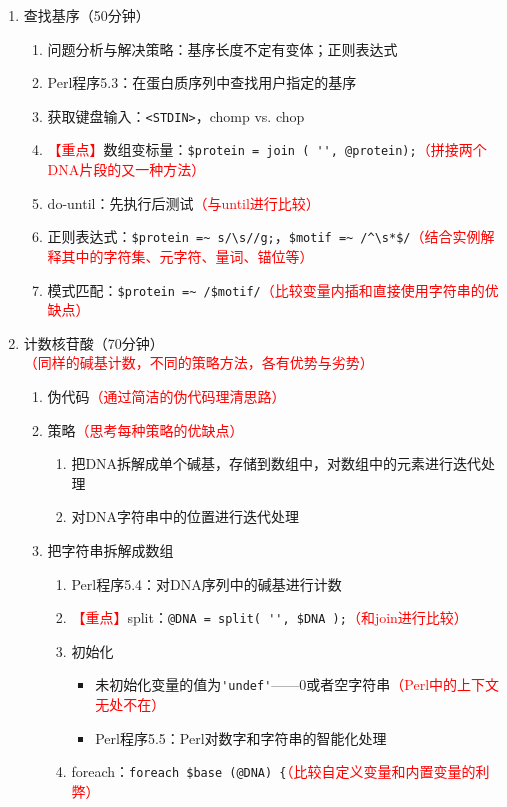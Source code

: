 \documentclass{TIJMUjiaoanLL}
\begin{document}
\begin{enumerate}
  \item 查找基序（50分钟）
    \begin{enumerate}
      \item 问题分析与解决策略：基序长度不定有变体；正则表达式
      \item Perl程序5.3：在蛋白质序列中查找用户指定的基序
      \item 获取键盘输入：\verb|<STDIN>|，chomp vs. chop
      \item \textcolor{red}{【重点】}数组变标量：\verb|$protein = join ( '', @protein);|\textcolor{red}{（拼接两个DNA片段的又一种方法）}
      \item do-until：先执行后测试\textcolor{red}{（与until进行比较）}
      \item 正则表达式：\verb|$protein =~ s/\s//g;|，\verb|$motif =~ /^\s*$/|\textcolor{red}{（结合实例解释其中的字符集、元字符、量词、锚位等）}
      \item 模式匹配：\verb|$protein =~ /$motif/|\textcolor{red}{（比较变量内插和直接使用字符串的优缺点）}
    \end{enumerate}
  \item 计数核苷酸（70分钟）\textcolor{red}{（同样的碱基计数，不同的策略方法，各有优势与劣势）}
    \begin{enumerate}
      \item 伪代码\textcolor{red}{（通过简洁的伪代码理清思路）}
      \item 策略\textcolor{red}{（思考每种策略的优缺点）}
	\begin{enumerate}
	  \item 把DNA拆解成单个碱基，存储到数组中，对数组中的元素进行迭代处理
	  \item 对DNA字符串中的位置进行迭代处理
	\end{enumerate}
      \item 把字符串拆解成数组
	\begin{enumerate}
	  \item Perl程序5.4：对DNA序列中的碱基进行计数
	  \item \textcolor{red}{【重点】}split：\verb|@DNA = split( '', $DNA );|\textcolor{red}{（和join进行比较）}
	  \item 初始化
	    \begin{itemize}
	      \item 未初始化变量的值为\verb|'undef'|——0或者空字符串\textcolor{red}{（Perl中的上下文无处不在）}
	      \item Perl程序5.5：Perl对数字和字符串的智能化处理
	    \end{itemize}
	  \item foreach：\verb|foreach $base (@DNA) {|\textcolor{red}{（比较自定义变量和内置变量的利弊）}

\end{enumerate}
\end{enumerate}
\end{enumerate}
\end{document}
